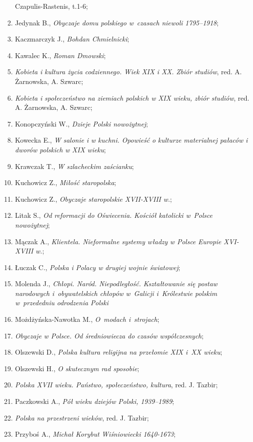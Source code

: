 \documentclass[a4paper,11pt]{article}
\begin{document}
\begin{enumerate}
  Czapulis-Rastenis, t.1-6;
\item Jedynak B., \emph{Obyczaje domu polskiego w~czasach niewoli
    1795--1918};
\item Kaczmarczyk J., \emph{Bohdan Chmielnicki};
\item Kawalec K., \emph{Roman Dmowski};
\item \emph{Kobieta i kultura życia codziennego. Wiek XIX i XX. Zbiór
    studiów}, red. A. Żarnowska, A. Szwarc;
\item \emph{Kobieta i społeczeństwo na ziemiach polskich w XIX wieku,
    zbiór studiów}, red. A. Żarnowska, A. Szwarc;
\item Konopczyński W., \emph{Dzieje Polski nowożytnej};
\item Kowecka E., \emph{W salonie i w kuchni. Opowieść o kulturze
    materialnej pałaców i dworów polskich w XIX wieku};
\item Krawczak T., \emph{W szlacheckim zaścianku};
\item Kuchowicz Z., \emph{Miłość staropolska};
\item Kuchowicz Z., \emph{Obyczaje staropolskie XVII-XVIII w.};
\item Litak S., \emph{Od reformacji do Oświecenia. Kościół katolicki
    w~Polsce nowożytnej};
\item Mączak A., \emph{Klientela. Nieformalne systemy władzy w Polsce
    Europie XVI-XVIII w.};
\item Łuczak C., \emph{Polska i Polacy w drugiej wojnie światowej};
\item Molenda J., \emph{Chłopi. Naród. Niepodległość. Kształtowanie
    się postaw narodowych i~obywatelskich chłopów w~Galicji
    i~Królestwie polskim w~przededniu odrodzenia Polski}
\item Możdżyńska-Nawotka M., \emph{O~modach i~strojach};
\item \emph{Obyczaje w Polsce. Od średniowiecza do czasów
    współczesnych};
\item Olszewski D., \emph{Polska kultura religijna na przełomie XIX
    i~XX wieku};
\item Olszewski H., \emph{O skutecznym rad sposobie};
\item \emph{Polska XVII wieku. Państwo, społeczeństwo, kultura}, red.
  J. Tazbir;
\item Paczkowski A., \emph{Pół wieku dziejów Polski, 1939--1989};
\item \emph{Polska na przestrzeni wieków}, red. J. Tazbir;
\item Przyboś A., \emph{Michał Korybut Wiśniowiecki 1640-1673};

\end{enumerate}
\end{document}
